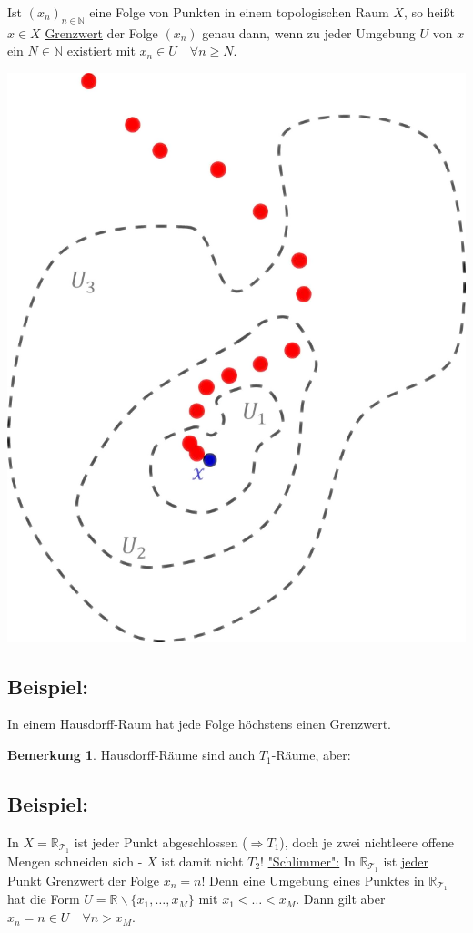 \documentclass[a4paper,11pt,notitlepage]{report}
\theoremstyle{definition}
\newtheorem{remark}{Bemerkung}[chapter]
\newcommand{\R}{{\ensuremath{\mathbb{R}}}}
\newcommand{\N}{{\ensuremath{\mathbb{N}}}}
\newenvironment{bsp}[1]
{
\setlength{\fboxsep}{10pt}
\subsection*{Beispiel: #1}
\begin{upshape}
}
{
\end{upshape}
}
\newenvironment{definition}[1]{
	\begin{definitions}
	\marginnote{\emph{#1}}
}{\end{definitions}}
\begin{document}
\begin{definition}{Grenzwert}
Ist $(x_n)_{n \in \N}$ eine Folge von Punkten in einem topologischen Raum $X$, so heißt $x \in X$ \underline{Grenzwert} der Folge $(x_n)$ genau dann, wenn zu jeder Umgebung $U$ von $x$ ein $N \in \N$ existiert mit $x_n \in U \quad \forall n \geq N$. 
\begin{center}
	\includegraphics[scale=0.3]{images/Grenzwert.png}
\end{center}
\end{definition}

\begin{bsp}{}
In einem Hausdorff-Raum hat jede Folge höchstens einen Grenzwert.
\end{bsp}

\begin{remark}
Hausdorff-Räume sind auch $T_1$-Räume, aber:
\end{remark}

\begin{bsp}{}
	In $X=\R_{\mathcal{T}_1}$ ist jeder Punkt abgeschlossen ($\Rightarrow T_1$), doch je zwei nichtleere offene Mengen schneiden sich - $X$ ist damit nicht $T_2$!
	\underline{"Schlimmer":} In $\R_{\mathcal{T}_1}$ ist \underline{jeder} Punkt Grenzwert der Folge $x_n = n$!
	Denn eine Umgebung eines Punktes in $\R_{\mathcal{T}_1}$ hat die Form $U = \R \backslash \{x_1, \ldots, x_M\}$ mit $x_1 < \ldots < x_M$. Dann gilt aber $x_n = n \in U \quad \forall n > x_M$.
\end{bsp}
\end{document}
